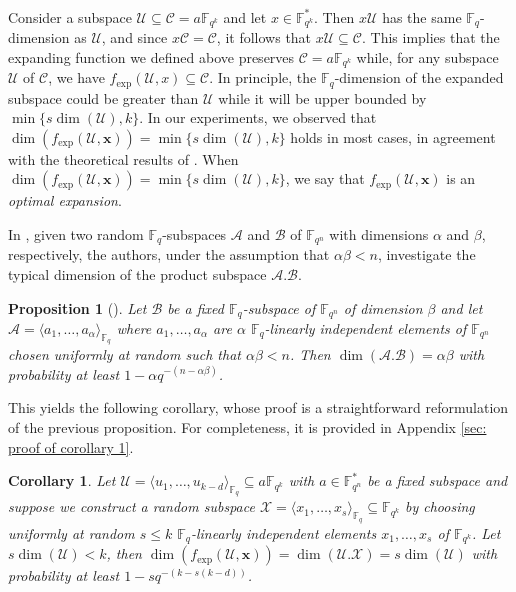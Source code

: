 \documentclass{article}
\newtheorem{proposition}{Proposition}
\newtheorem{corollary}{Corollary}
\newcommand{\Fq}{\mathbb{F}_{q}}
\newcommand{\Fqn}{\mathbb{F}_{q^n}}
\newcommand{\Fqk}{\mathbb{F}_{q^k}}
\newcommand{\calA}{\mathcal{A}}
\newcommand{\calB}{\mathcal{B}}
\newcommand{\calC}{\mathcal{C}}
\newcommand{\calU}{\mathcal{U}}
\newcommand{\calX}{\mathcal{X}}
\newcommand{\fexp}{f_{\mathrm{exp}}}
\newcommand{\Span}[2]{\langle #2 \rangle_{#1}}
\begin{document}
\\
\par Consider a subspace $\calU \subseteq \calC = a \Fqk$ and let $x \in \Fqk^*$. Then $x \calU$ has the same $\Fq$-dimension as $\calU$, and since $x\calC=\calC$, it follows that $x \calU \subseteq \calC$.
This implies that the expanding function we defined above preserves $\calC= a \Fqk$ while, for any subspace $\calU$ of $\calC$, we have $\fexp(\calU, x)\subseteq \calC.$ 
In principle, the $\Fq$-dimension of the expanded subspace could be greater than $\calU$ while it will be upper bounded by $\min\{s \dim(\calU), k \}.$ In our experiments, we observed that $\dim(\fexp(\calU, \bm x))=\min\{s \dim(\calU), k \}$ holds in most cases, in agreement with the theoretical results of \cite{Aragon19}. When $\dim(\fexp(\calU, \bm x))=\min\{s \dim(\calU), k \}$, we say that $\fexp(\calU, \bm x)$ is an \textit{optimal expansion}.
\par In \cite{Aragon19}, given two random $\Fq$-subspaces $\calA$ and $\calB$ of $\Fqn$ with dimensions $\alpha$ and $\beta$, respectively, the authors, under the assumption that $\alpha\beta < n$, investigate the typical dimension of the product subspace $\calA.\calB$. 
\begin{proposition}[{\cite[Proposition III.3]{Aragon19}}]\label{prop: expected dimension of the expansion}
    Let $\calB$ be a fixed $\Fq$-subspace of $\Fqn$ of dimension $\beta$ and let $\calA=\langle a_1,\ldots,a_{\alpha}\rangle_{\Fq}$ where $a_1,\ldots,a_{\alpha}$ are $\alpha$ $\Fq$-linearly independent elements of $\Fqn$ chosen uniformly at random such that $\alpha\beta < n$.  Then $\dim(\calA.\calB)=\alpha\beta$ with probability at least $1-\alpha q^{-(n-\alpha\beta)}$.
\end{proposition}
This yields the following corollary, whose proof is a straightforward reformulation of the previous proposition. For completeness, it is provided in Appendix \ref{sec: proof of corollary 1}.
\begin{corollary}
    \label{cor: expected dimension of the expansion}
    Let $\calU = \Span{\Fq}{u_1, \dots, u_{k-d}}\subseteq a\Fqk$ with $a\in\Fqn^*$ be a fixed subspace and suppose we construct a random subspace $\calX = \Span{\Fq}{x_1,\ldots,x_s} \subseteq \Fqk$ by choosing uniformly at random $s \leq k$ $\Fq$-linearly independent elements $x_1,\ldots,x_s$ of $\Fqk$. Let $s \dim(\calU)<k$, then $\dim(\fexp(\calU, \bm x))=\dim(\calU.\calX)=s \dim(\calU)$ with probability at least $1-s q^{-(k-s(k-d))}$.
\end{corollary}
\end{document}
